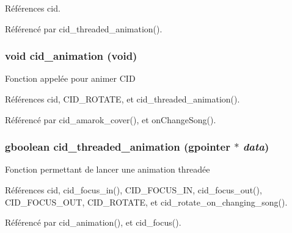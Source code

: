 Références cid.

Référencé par cid\_\-threaded\_\-animation().
\subsubsection{\setlength{\rightskip}{0pt plus 5cm}void cid\_\-animation (void)}\label{cid-main_8h_91ad784513daa5eaf6e6216cc4da9f5e}


Fonction appelée pour animer CID 

Références cid, CID\_\-ROTATE, et cid\_\-threaded\_\-animation().

Référencé par cid\_\-amarok\_\-cover(), et onChangeSong().
\subsubsection{\setlength{\rightskip}{0pt plus 5cm}gboolean cid\_\-threaded\_\-animation (gpointer $\ast$ {\em data})}\label{cid-main_8h_388cbc7682b3b0da4860795ccdb70111}


Fonction permettant de lancer une animation threadée 

Références cid, cid\_\-focus\_\-in(), CID\_\-FOCUS\_\-IN, cid\_\-focus\_\-out(), CID\_\-FOCUS\_\-OUT, CID\_\-ROTATE, et cid\_\-rotate\_\-on\_\-changing\_\-song().

Référencé par cid\_\-animation(), et cid\_\-focus().